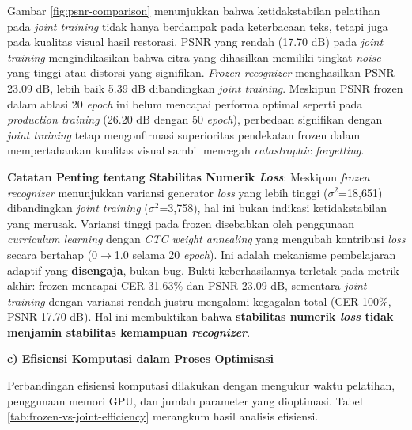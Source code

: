 \documentclass[12pt,a4paper]{article}
\begin{document}
Gambar \ref{fig:psnr-comparison} menunjukkan bahwa ketidakstabilan pelatihan pada \textit{joint training} tidak hanya berdampak pada keterbacaan teks, tetapi juga pada kualitas visual hasil restorasi. PSNR yang rendah (17.70 dB) pada \textit{joint training} mengindikasikan bahwa citra yang dihasilkan memiliki tingkat \textit{noise} yang tinggi atau distorsi yang signifikan. \textit{Frozen recognizer} menghasilkan PSNR 23.09 dB, lebih baik 5.39 dB dibandingkan \textit{joint training}. Meskipun PSNR frozen dalam ablasi 20 \textit{epoch} ini belum mencapai performa optimal seperti pada \textit{production training} (26.20 dB dengan 50 \textit{epoch}), perbedaan signifikan dengan \textit{joint training} tetap mengonfirmasi superioritas pendekatan frozen dalam mempertahankan kualitas visual sambil mencegah \textit{catastrophic forgetting}.

\vspace{0.5em}

\textbf{Catatan Penting tentang Stabilitas Numerik \textit{Loss}}:
Meskipun \textit{frozen recognizer} menunjukkan variansi generator \textit{loss} yang lebih tinggi ($\sigma^2$=18,651) dibandingkan \textit{joint training} ($\sigma^2$=3,758), hal ini bukan indikasi ketidakstabilan yang merusak. Variansi tinggi pada frozen disebabkan oleh penggunaan \textit{curriculum learning} dengan \textit{CTC weight annealing} yang mengubah kontribusi \textit{loss} secara bertahap (0$\rightarrow$1.0 selama 20 \textit{epoch}). Ini adalah mekanisme pembelajaran adaptif yang \textbf{disengaja}, bukan bug. Bukti keberhasilannya terletak pada metrik akhir: frozen mencapai CER 31.63\% dan PSNR 23.09 dB, sementara \textit{joint training} dengan variansi rendah justru mengalami kegagalan total (CER 100\%, PSNR 17.70 dB). Hal ini membuktikan bahwa \textbf{stabilitas numerik \textit{loss} tidak menjamin stabilitas kemampuan \textit{recognizer}}.

\vspace{0.5em}

\textbf{c) Efisiensi Komputasi dalam Proses Optimisasi}

Perbandingan efisiensi komputasi dilakukan dengan mengukur waktu pelatihan, penggunaan memori GPU, dan jumlah parameter yang dioptimasi. Tabel \ref{tab:frozen-vs-joint-efficiency} merangkum hasil analisis efisiensi.
\end{document}
